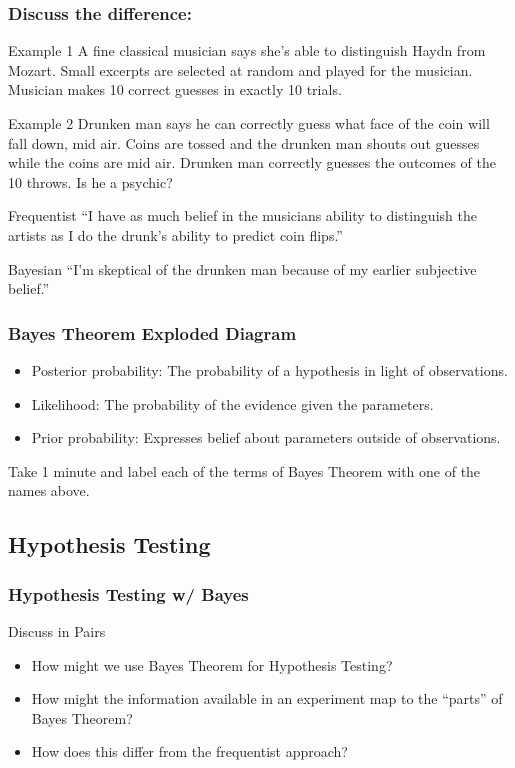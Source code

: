 \documentclass{beamer}
\begin{document}
\begin{frame}
  \frametitle{Discuss the difference:}
  \begin{block}{Example 1}
    A fine classical musician says she’s able to distinguish Haydn from Mozart. Small excerpts are selected at random and played for the musician. Musician makes 10 correct guesses in exactly 10 trials.
  \end{block}
  \begin{block}{Example 2}
    Drunken man says he can correctly guess what face of the coin will fall down, mid air. Coins are tossed and the drunken man shouts out guesses while the coins are mid air. Drunken man correctly guesses the outcomes of the 10 throws. Is he a psychic?
  \end{block}
\end{frame}

\begin{frame}
  \begin{block}{Frequentist}
    ``I have as much belief in the musicians ability to distinguish the artists as I do the drunk's ability to predict coin flips.''
  \end{block}
  \begin{block}
    {Bayesian}
    ``I'm skeptical of the drunken man because of my earlier subjective belief.''
  \end{block}
\end{frame}

\begin{frame}
  \frametitle{Bayes Theorem Exploded Diagram}
  \begin{itemize}
  \item Posterior probability: The probability of a hypothesis in light of observations.
  \item Likelihood: The probability of the evidence given the parameters.
  \item Prior probability: Expresses belief about parameters outside of observations.
  \end{itemize}

  Take 1 minute and label each of the terms of Bayes Theorem with one of the names above.
\end{frame}

\subsection{Hypothesis Testing}
\begin{frame}
  \frametitle{Hypothesis Testing w/ Bayes}
  \begin{block}
    {Discuss in Pairs}
    \begin{itemize}
    \item How might we use Bayes Theorem for Hypothesis Testing?
    \item How might the information available in an experiment map to the ``parts'' of Bayes Theorem?
    \item How does this differ from the frequentist approach?
    \end{itemize}
  \end{block}
\end{frame}
\end{document}

